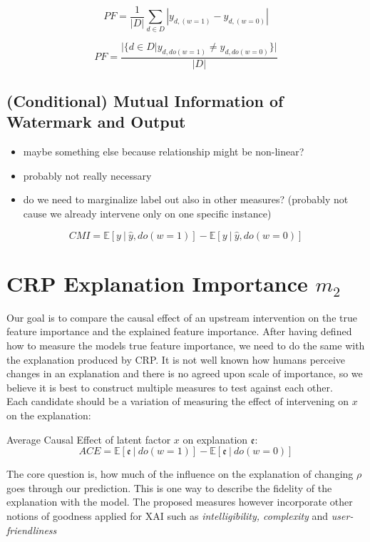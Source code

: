 \begin{equation}
\displaystyle 
PF =\frac{1}{|D|} \sum_{d \in D} |y_{d, (w=1)} - y_{d, (w=0)} |
\end{equation}

\begin{equation}
\displaystyle 
    PF = \frac{|\{d \in D | y_{d, do(w=1)} \neq y_{d, do(w=0)}\}|}{|D|}
\end{equation}

\subsection{(Conditional) Mutual Information of Watermark and Output}
\begin{itemize}
    \item maybe something else because relationship might be non-linear?
    \item probably not really necessary
    \item do we need to marginalize label out also in other measures? (probably not cause we already intervene only on one specific instance)
\end{itemize}
\begin{equation}
\displaystyle CMI = \mathbb{E} [ y \ | \ \widehat{y}, do(w=1) ] - \mathbb{E} [ y \ | \ \widehat{y}, do(w=0) ]
\end{equation}

\section{CRP Explanation Importance $m_2$}\label{section:measure}
Our goal is to compare the causal effect of an upstream intervention on the true feature importance and the explained feature importance. After having defined how to measure the models true feature importance, we need to do the same with the explanation produced by CRP. It is not well known how humans perceive changes in an explanation and there is no agreed upon scale of importance, so we believe it is best to construct multiple measures to test against each other. \\

Each candidate should be a variation of measuring the effect of intervening on $x$ on the explanation:
\begin{center}
Average Causal Effect of latent factor $x$ on explanation $\mathfrak{e}$: \\
\begin{equation}
\displaystyle ACE = \mathbb{E} [\mathfrak{e} \ | \ do(w=1) ] - \mathbb{E} [ \mathfrak{e} \ | \ do(w=0) ]
\end{equation}
\end{center}
The core question is, how much of the influence on the explanation of changing $\rho$ goes through our prediction. This is one way to describe the fidelity of the explanation with the model. The proposed measures however incorporate other notions of goodness applied for XAI such as \textit{intelligibility, complexity} and \textit{ user-friendliness} 

